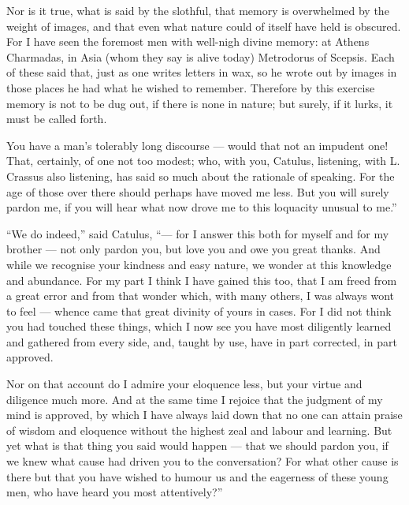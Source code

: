  Nor is it true, what is said by the slothful, that memory is overwhelmed by the weight of images, and that even what nature could of itself have held is obscured. For I have seen the foremost men with well-nigh divine memory: at Athens Charmadas, in Asia (whom they say is alive today) Metrodorus of Scepsis. Each of these said that, just as one writes letters in wax, so he wrote out by images in those places he had what he wished to remember. Therefore by this exercise memory is not to be dug out, if there is none in nature; but surely, if it lurks, it must be called forth.

 You have a man's tolerably long discourse — would that not an impudent one! That, certainly, of one not too modest; who, with you, Catulus, listening, with L. Crassus also listening, has said so much about the rationale of speaking. For the age of those over there should perhaps have moved me less. But you will surely pardon me, if you will hear what now drove me to this loquacity unusual to me.''

 ``We do indeed,'' said Catulus, ``— for I answer this both for myself and for my brother — not only pardon you, but love you and owe you great thanks. And while we recognise your kindness and easy nature, we wonder at this knowledge and abundance. For my part I think I have gained this too, that I am freed from a great error and from that wonder which, with many others, I was always wont to feel — whence came that great divinity of yours in cases. For I did not think you had touched these things, which I now see you have most diligently learned and gathered from every side, and, taught by use, have in part corrected, in part approved.

 Nor on that account do I admire your eloquence less, but your virtue and diligence much more. And at the same time I rejoice that the judgment of my mind is approved, by which I have always laid down that no one can attain praise of wisdom and eloquence without the highest zeal and labour and learning. But yet what is that thing you said would happen — that we should pardon you, if we knew what cause had driven you to the conversation? For what other cause is there but that you have wished to humour us and the eagerness of these young men, who have heard you most attentively?''

